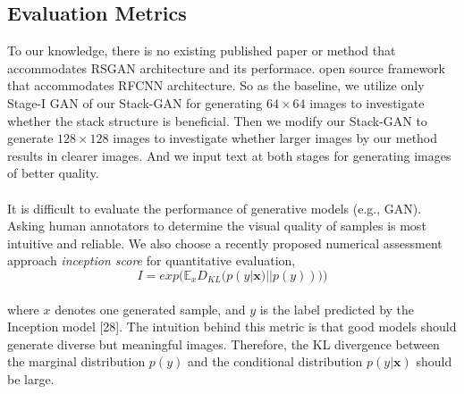 \documentclass{article}
\begin{document}


\subsection{Evaluation Metrics}
To our knowledge, there is no existing published paper or method that accommodates RSGAN architecture and its performace.  open source framework that accommodates RFCNN architecture. So  as the baseline, we utilize only Stage-I GAN of our Stack-GAN for generating $64 \times 64$ images to investigate whether the stack structure is beneficial. Then we modify our Stack-GAN to generate $128 \times 128$ images to investigate whether larger images by our method results in clearer images. And we input text at both stages for generating images of better quality.
\\\\
It is difficult to evaluate the performance of generative models (e.g., GAN). Asking human annotators to determine the visual quality of samples is most intuitive and reliable. We also choose a recently proposed numerical assessment approach \textit{inception score} \cite{improvGan2016} for quantitative evaluation,
$$ I = exp \Big(\mathbb{E}_x D_{KL} \big(p(y|\textbf{x}) || p(y)) \big) \Big)$$
\\
where $x$ denotes one generated sample, and $y$ is the label predicted by the Inception model [28]. The intuition behind this metric is that good models should generate diverse but meaningful images. Therefore, the KL divergence between the marginal distribution $p(y)$ and the conditional distribution $p(y|\textbf{x})$ should be large.
\end{document}
